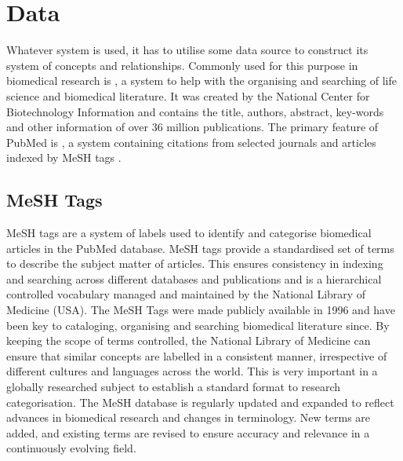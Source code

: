 \documentclass{l4proj}
\begin{document}
\section{Data}

Whatever system is used, it has to utilise some data source to construct its system of concepts and relationships. Commonly used for this purpose in biomedical research is \cite{pubmed}, a system to help with the organising and searching of life science and biomedical literature. It was created by the National Center for Biotechnology Information and contains the title, authors, abstract, key-words and other information of over 36 million publications. The primary feature of PubMed is \cite{medline}, a system containing citations from selected journals and articles indexed by MeSH tags \citep{mesh_home}. \\

\subsection{MeSH Tags}

MeSH tags are a system of labels used to identify and categorise biomedical articles in the PubMed database. MeSH tags provide a standardised set of terms to describe the subject matter of articles. This ensures consistency in indexing and searching across different databases and publications and is a hierarchical controlled vocabulary managed and maintained by the National Library of Medicine (USA). The MeSH Tags were made publicly available in 1996 and have been key to cataloging, organising and searching biomedical literature since. By keeping the scope of terms controlled, the National Library of Medicine can ensure that similar concepts are labelled in a consistent manner, irrespective of different cultures and languages across the world. This is very important in a globally researched subject to establish a standard format to research categorisation. The MeSH database is regularly updated and expanded to reflect advances in biomedical research and changes in terminology. New terms are added, and existing terms are revised to ensure accuracy and relevance in a continuously evolving field. \\
\end{document}
